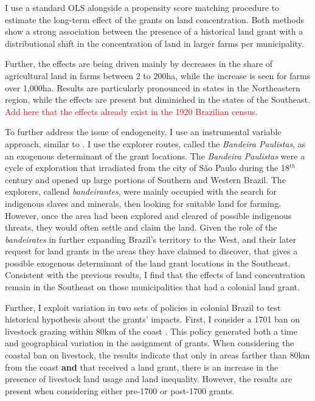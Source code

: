 \documentclass[11pt]{article}
\newcommand{\red}[1]{\textcolor{red}{#1}}
\begin{document}
I use a standard OLS alongside a propensity score matching procedure to estimate the long-term effect of the grants on land concentration. 
Both methods show a strong association between the presence of a historical land grant with a distributional shift in the concentration of land in larger farms per municipality.
\begin{comment}
The estimates indicate that the presence of a \textit{sesmaria} is associated with an increase of 3 percentage points in the share of agricultural land in farms over 2,000ha in a municipality. 
Estimates on land inequality are also higher for grants pre-1700, with estimated effects of 4 percentage points, while post-1700 grants are only associated with a 2.3 percentage points increase in the share of agricultural land in farms over 2,000 ha.
\end{comment}
Further, the effects are being driven mainly by decreases in the share of agricultural land in farms between 2 to 200ha, while the increase is seen for farms over 1,000ha.
Results are particularly pronounced in states in the Northeastern region, while the effects are present but diminished in the states of the Southeast. 
\red{Add here that the effects already exist in the 1920 Brazilian census.}

To further address the issue of endogeneity, I use an instrumental variable approach, similar to \textcite{Duranton2011-rv}. 
I use the explorer routes, called the \textit{Bandeira Paulistas}, as an exogenous determinant of the grant locations. 
The \textit{Bandeira Paulistas} were a cycle of exploration that irradiated from the city of São Paulo during the 18$^{th}$ century and opened up large portions of Southern and Western Brazil.
The explorers, callend \textit{bandeirantes}, were mainly occupied with the search for indigenous slaves and minerals, then looking for suitable land for farming. 
However, once the area had been explored and cleared of possible indigenous threats, they would often settle and claim the land. 
Given the role of the \textit{bandeirates} in further expanding Brazil's territory to the West, and their later request for land grants in the areas they have claimed to discover, that gives a possible exogenous determinant of the land grant locations in the Southeast. 
Consistent with the previous results, I find that the effects of land concentration remain in the Southeast on those municipalities that had a colonial land grant. 

Further, I exploit variation in two sets of policies in colonial Brazil to test historical hypothesis about the grants' impacts. 
First, I consider a 1701 ban on livestock grazing within 80km of the coast \parencites[p~.40]{Fausto2014-bh}[p~.198]{Simonsen2005-ps}[p~.460]{Bethell1984-of}. 
This policy generated both a time and geographical variation in the assignment of grants. 
When considering the coastal ban on livestock, the results indicate that only in areas farther than 80km from the coast \textbf{and} that received a land grant, there is an increase in the presence of livestock land usage and land inequality.
However, the results are present when considering either pre-1700 or post-1700 grants.
\end{document}
